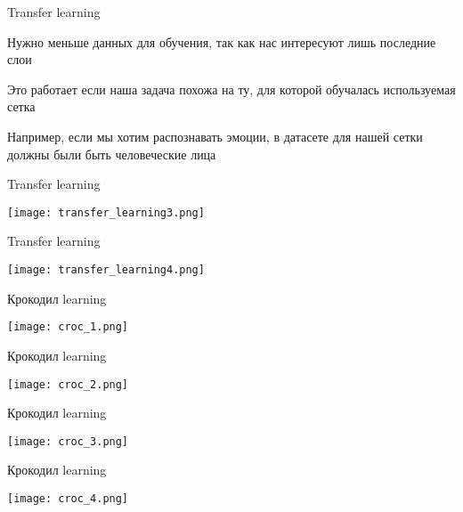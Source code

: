 \documentclass[notes,12pt, aspectratio=169]{beamer}
\newenvironment{wideitemize}{\itemize\addtolength{\itemsep}{10pt}}{\enditemize}
\begin{document}
\begin{frame}{Transfer learning}
\begin{wideitemize}
	\item  Нужно меньше данных для обучения, так как нас интересуют лишь последние слои
	\item  Это работает если наша задача похожа на ту, для которой обучалась используемая сетка
	\item  Например, если мы хотим распознавать эмоции, в датасете для нашей сетки должны были быть человеческие лица
\end{wideitemize}
\end{frame}


\begin{frame}{Transfer learning}
\begin{center}
	\texttt{[image: transfer\_learning3.png]}
\end{center}
\end{frame}


\begin{frame}{Transfer learning}
\begin{center}
	\texttt{[image: transfer\_learning4.png]}
\end{center}
\end{frame}

\begin{frame}{Крокодил learning}
\begin{center}
	\texttt{[image: croc\_1.png]}
\end{center}
\end{frame}

\begin{frame}{Крокодил learning}
\begin{center}
	\texttt{[image: croc\_2.png]}
\end{center}
\end{frame}

\begin{frame}{Крокодил learning}
\begin{center}
	\texttt{[image: croc\_3.png]}
\end{center}
\end{frame}

\begin{frame}{Крокодил learning}
\begin{center}
	\texttt{[image: croc\_4.png]}
\end{center}
\end{frame}
\end{document}
